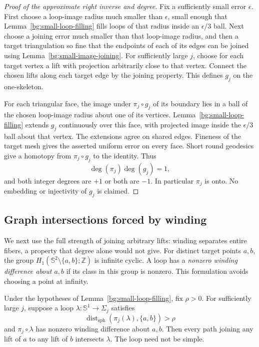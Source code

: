 \begin{proof}[Proof of the approximate right inverse and degree]
Fix a sufficiently small error $\epsilon$. First choose a loop-image
radius much smaller than $\epsilon$, small enough that
Lemma~\ref{bg:small-loop-filling} fills loops of that radius inside
an $\epsilon/3$ ball. Next choose a joining error much smaller than
that loop-image radius, and then a target triangulation so fine that
the endpoints of each of its edges can be joined using
Lemma~\ref{bg:small-image-joining}. For sufficiently large $j$,
choose for each target vertex a lift with projection arbitrarily
close to that vertex. Connect the chosen lifts along each target
edge by the joining property. This defines $g_j$ on the
one-skeleton.

For each triangular face, the image under $\pi_j\circ g_j$ of its
boundary lies in a ball of the chosen loop-image radius about one
of its vertices. Lemma~\ref{bg:small-loop-filling} extends $g_j$
continuously over this face, with projected image inside the
$\epsilon/3$ ball about that vertex. The extensions agree on shared
edges. Fineness of the target mesh gives the asserted uniform error
on every face. Short round geodesics give a homotopy from
$\pi_j\circ g_j$ to the identity. Thus
\[
 \deg(\pi_j)\deg(g_j)=1,
\]
and both integer degrees are $+1$ or both are $-1$. In particular
$\pi_j$ is onto. No embedding or injectivity of $g_j$ is claimed.
\end{proof}

\subsection{Graph intersections forced by winding}

We next use the full strength of joining arbitrary lifts: winding
separates entire fibers, a property that degree alone would not give.
For distinct target points $a,b$, the group
$H_1(\mathbb S^2\setminus\{a,b\};\mathbb Z)$ is infinite cyclic.
A loop has a \emph{nonzero winding difference about $a,b$} if its
class in this group is nonzero. This formulation avoids choosing a
point at infinity.

\begin{lemma}
\label{bg:winding-separation}
Under the hypotheses of Lemma~\ref{bg:small-loop-filling},
fix $\rho>0$. For sufficiently large $j$, suppose a loop
$\lambda:\mathbb S^1\to\Sigma_j$ satisfies
\[
 \operatorname{dist}_{\mathrm{sph}}
       (\pi_j(\lambda),\{a,b\})>\rho
\]
and $\pi_j\circ\lambda$ has nonzero winding difference about $a,b$.
Then every path joining any lift of $a$ to any lift of $b$ intersects
$\lambda$. The loop need not be simple.
\end{lemma}

